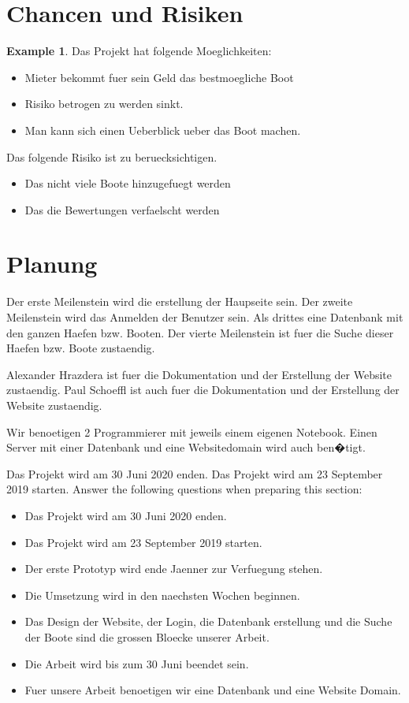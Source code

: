 \documentclass[12pt]{article}
\theoremstyle{definition}
\newtheorem{example}{Example}
\newenvironment{explanation}{%
   \setlength{\parindent}{0pt}
   \itshape
   \color{blue}
}{}
\begin{document}
\pagebreak
\section{Chancen und Risiken}
\begin{example}
Das Projekt hat folgende Moeglichkeiten:
\begin{itemize}
\item Mieter bekommt fuer sein Geld das bestmoegliche Boot
\item Risiko betrogen zu werden sinkt.
\item Man kann sich einen Ueberblick ueber das Boot machen.
\end{itemize}

Das folgende Risiko ist zu beruecksichtigen.
\begin{itemize}
\item Das nicht viele Boote hinzugefuegt werden
\item Das die Bewertungen verfaelscht werden
\end{itemize}

\end{example}

\pagebreak
\section{Planung}
\begin{explanation}
Der erste Meilenstein wird die erstellung der Haupseite sein.
Der zweite Meilenstein wird das Anmelden der Benutzer sein.
Als drittes eine Datenbank mit den ganzen Haefen bzw. Booten.
Der vierte Meilenstein ist fuer die Suche dieser Haefen bzw. Boote zustaendig.

Alexander Hrazdera ist fuer die Dokumentation und der Erstellung der Website zustaendig.
Paul Schoeffl ist auch fuer die Dokumentation und der Erstellung der Website zustaendig. 

Wir benoetigen 2 Programmierer mit jeweils einem eigenen Notebook. Einen Server mit einer Datenbank und eine Websitedomain wird auch ben�tigt.

Das Projekt wird am 30 Juni 2020 enden.
Das Projekt wird am 23 September 2019 starten. 
Answer the following questions when preparing this section:
\begin{itemize}
\item Das Projekt wird am 30 Juni 2020 enden.
\item Das Projekt wird am 23 September 2019 starten.
\item Der erste Prototyp wird ende Jaenner zur Verfuegung stehen.
\item Die Umsetzung wird in den naechsten Wochen beginnen.
\item Das Design der Website, der Login, die Datenbank erstellung und die Suche der Boote sind die grossen Bloecke unserer Arbeit.
\item Die Arbeit wird bis zum 30 Juni beendet sein.
\item Fuer unsere Arbeit benoetigen wir eine Datenbank und eine Website Domain.
\end{itemize}
\end{explanation}
\end{document}
